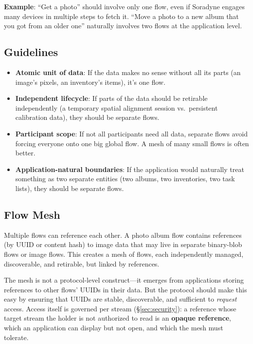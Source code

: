 \documentclass[11pt, letterpaper]{article}
\begin{document}
\textbf{Example}: ``Get a photo'' should involve only one flow, even if Soradyne
engages many devices in multiple steps to fetch it. ``Move a photo to a new album
that you got from an older one'' naturally involves two flows at the application level.

\subsection{Guidelines}

\begin{itemize}[leftmargin=2em]
  \item \textbf{Atomic unit of data}: If the data makes no sense without all its parts
    (an image's pixels, an inventory's items), it's one flow.
  \item \textbf{Independent lifecycle}: If parts of the data should be retirable
    independently (a temporary spatial alignment session vs.\ persistent calibration
    data), they should be separate flows.
  \item \textbf{Participant scope}: If not all participants need all data, separate
    flows avoid forcing everyone onto one big global flow. A mesh of many small flows
    is often better.
  \item \textbf{Application-natural boundaries}: If the application would naturally
    treat something as two separate entities (two albums, two inventories, two task
    lists), they should be separate flows.
\end{itemize}

\subsection{Flow Mesh}

Multiple flows can reference each other. A photo album flow contains references (by
UUID or content hash) to image data that may live in separate binary-blob flows or
image flows. This creates a mesh of flows, each independently managed, discoverable,
and retirable, but linked by references.

The mesh is not a protocol-level construct---it emerges from applications storing
references to other flows' UUIDs in their data. But the protocol should make this
easy by ensuring that UUIDs are stable, discoverable, and sufficient to \emph{request}
access. Access itself is governed per stream (\S\ref{sec:security}): a reference whose
target stream the holder is not authorized to read is an \textbf{opaque reference},
which an application can display but not open, and which the mesh must tolerate.
\end{document}
